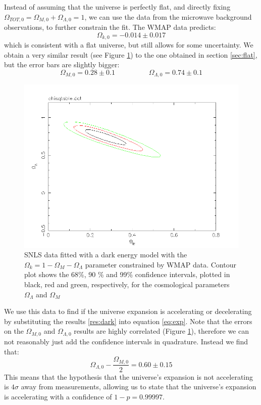 \documentclass[11pt]{article}
\begin{document}
Instead of assuming that the universe is perfectly flat, and directly fixing $\Omega_{TOT,0} = \Omega_{M,0} + \Omega_{\Lambda,0} = 1$, we can use the data from the microwave background observations, to further constrain the fit. The WMAP data predicts:
\begin{equation}
	\Omega_{k,0} = -0.014 \pm 0.017
	\label{res:WMAP}
\end{equation}
which is consistent with a flat universe, but still allows for some uncertainty. We obtain a very similar result (see Figure \ref{fig:dark}) to the one obtained in section \ref{sec:flat}, but the error bars are slightly bigger: 
\begin{equation}
	\Omega_{M,0} = 0.28 \pm 0.1
	\hspace{2cm}
	\Omega_{\Lambda,0} = 0.74 \pm 0.1
	\label{res:dark}
\end{equation}
\begin{figure}[htbp]
	\centering
	\includegraphics[width=0.8\linewidth]{dark.png}
	\caption{SNLS data fitted with a dark energy model with the $\Omega_k = 1 - \Omega_M - \Omega_{\Lambda}$ parameter constrained by WMAP data. Contour plot shows the 68\%, 90 \% and 99\% confidence intervals, plotted in black, red and green, respectively, for the cosmological parameters $\Omega_\Lambda$ and $\Omega_M$}
	\label{fig:dark}
\end{figure}
We use this data to find if the universe expansion is accelerating or decelerating by substituting the results \eqref{res:dark} into equation \eqref{eq:exp}. Note that the errors on the $\Omega_{M,0}$ and $\Omega_{\Lambda,0}$ results are highly correlated (Figure \ref{fig:dark}), therefore we can not reasonably just add the confidence intervals in quadrature. Instead we find that: 
\begin{equation}
	\Omega_{\Lambda,0} - \frac{\Omega_{M,0}}{2} = 0.60 \pm 0.15
\end{equation}
This means that the hypothesis that the universe's expansion is not accelerating is $4 \sigma$ away from measurements, allowing us to state that the universe's expansion is accelerating with a confidence of $1-p = 0.99997$. 
\end{document}
